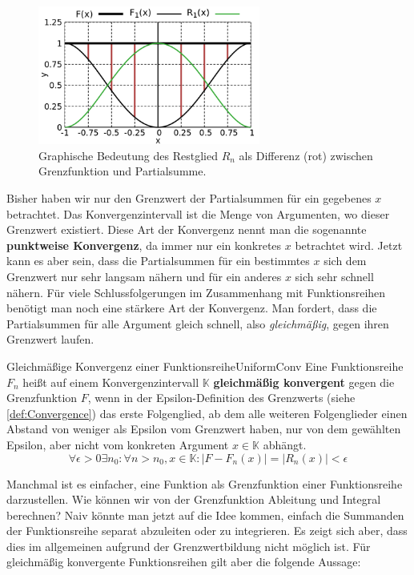 \begin{figure}
    \centering
    \includegraphics[width=0.65\textwidth]{./gnuplot/function-sum-error-term}
    \caption[Restglied zwischen Grenzfunktion und Partialsumme]{Graphische Bedeutung des Restglied $R_n$ als Differenz (rot) zwischen Grenzfunktion und Partialsumme.}
    \label{fig:ExFunErrTerm}
\end{figure}

Bisher haben wir nur den Grenzwert der Partialsummen für ein gegebenes $x$ betrachtet. Das Konvergenzintervall ist die Menge von Argumenten, wo dieser Grenzwert existiert. Diese Art der Konvergenz nennt man die sogenannte \textbf{punktweise Konvergenz}, da immer nur ein konkretes $x$ betrachtet wird. Jetzt kann es aber sein, dass die Partialsummen für ein bestimmtes $x$ sich dem Grenzwert nur sehr langsam nähern und für ein anderes $x$ sich sehr schnell nähern. Für viele Schlussfolgerungen im Zusammenhang mit Funktionsreihen benötigt man noch eine stärkere Art der Konvergenz. Man fordert, dass die Partialsummen für alle Argument gleich schnell, also \emph{gleichmäßig}, gegen ihren Grenzwert laufen.

\begin{definition}{Gleichmäßige Konvergenz einer Funktionsreihe}{UniformConv}
    Eine Funktionsreihe $F_n$ heißt auf einem Konvergenzintervall $\mathbb{K}$ \textbf{gleichmäßig konvergent} gegen die Grenzfunktion $F$, wenn in der Epsilon-Definition des Grenzwerts (siehe \ref{def:Convergence}) das erste Folgenglied, ab dem alle weiteren Folgenglieder einen Abstand von weniger als Epsilon vom Grenzwert haben, nur von dem gewählten Epsilon, aber nicht vom konkreten Argument $x\in\mathbb{K}$ abhängt.
    $$
        \forall \epsilon > 0 \exists n_0: \forall n > n_0, x \in \mathbb{K}: |F-F_n(x)| = |R_n(x)| < \epsilon
    $$
\end{definition}

Manchmal ist es einfacher, eine Funktion als Grenzfunktion einer Funktionsreihe darzustellen. Wie können wir von der Grenzfunktion Ableitung und Integral berechnen? Naiv könnte man jetzt auf die Idee kommen, einfach die Summanden der Funktionsreihe separat abzuleiten oder zu integrieren. Es zeigt sich aber, dass dies im allgemeinen aufgrund der Grenzwertbildung nicht möglich ist. Für gleichmäßig konvergente Funktionsreihen gilt aber die folgende Aussage:

